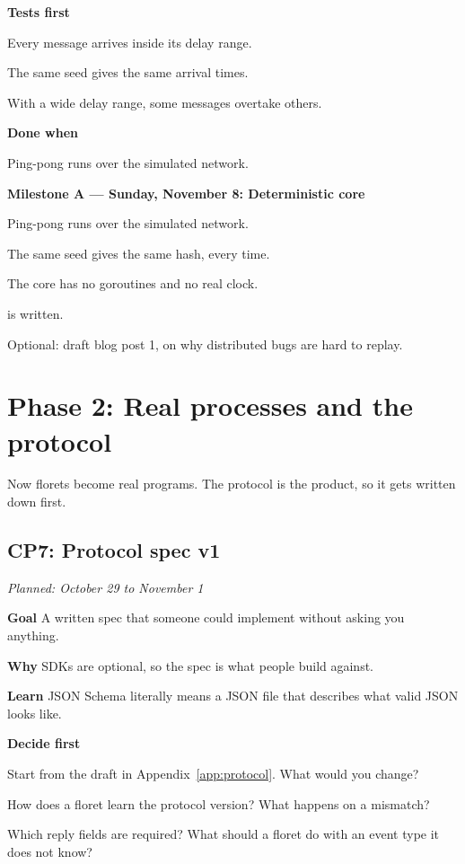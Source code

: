 \documentclass[11pt,letterpaper]{article}
\newcommand{\code}[1]{\texttt{\detokenize{#1}}}
\newcommand{\lbl}[1]{\textbf{#1}\enspace}
\newcommand{\when}[1]{\par\textit{Planned: #1}\par}
\newenvironment{milestone}[1]{\begin{framed}\noindent\textbf{#1}\par}{\end{framed}}
\begin{document}
\lbl{Tests first}
\begin{checks}
  \item Every message arrives inside its delay range.
  \item The same seed gives the same arrival times.
  \item With a wide delay range, some messages overtake others.
\end{checks}

\lbl{Done when}
\begin{checks}
  \item Ping-pong runs over the simulated network.
\end{checks}

\begin{milestone}{Milestone A --- Sunday, November 8: Deterministic core}
\begin{checks}
  \item Ping-pong runs over the simulated network.
  \item The same seed gives the same hash, every time.
  \item The core has no goroutines and no real clock.
  \item \code{PROTOCOL.md} is written.
  \item Optional: draft blog post 1, on why distributed bugs are hard to replay.
\end{checks}
\end{milestone}

\section{Phase 2: Real processes and the protocol}

Now florets become real programs. The protocol is the product, so it gets written down first.

\subsection{CP7: Protocol spec v1}
\when{October 29 to November 1}

\lbl{Goal} A written spec that someone could implement without asking you anything.

\lbl{Why} SDKs are optional, so the spec is what people build against.

\lbl{Learn} JSON Schema literally means a JSON file that describes what valid JSON looks like.

\lbl{Decide first}
\begin{asks}
  \item Start from the draft in Appendix~\ref{app:protocol}. What would you change?
  \item How does a floret learn the protocol version? What happens on a mismatch?
  \item Which reply fields are required? What should a floret do with an event type it does not know?
\end{asks}
\end{document}

